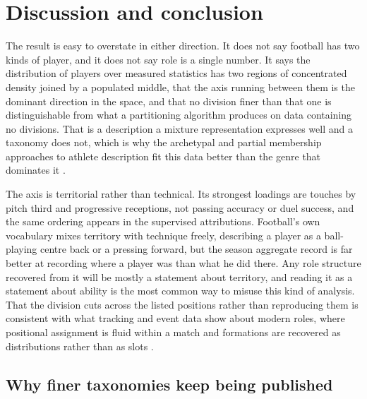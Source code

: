 \section{Discussion and conclusion}
\label{sec:discussion}

The result is easy to overstate in either direction. It does not say football has two kinds of
player, and it does not say role is a single number. It says the distribution of players over
\ArcFeatures{} measured statistics has two regions of concentrated density joined by a populated
middle, that the axis running between them is the dominant direction in the space, and that no
division finer than that one is distinguishable from what a partitioning algorithm produces on
data containing no divisions. That is a description a mixture representation expresses well and a
taxonomy does not, which is why the archetypal and partial membership approaches to athlete
description fit this data better than the genre that dominates it \citep{eugster2012performance,
seri2024partial}.

The axis is territorial rather than technical. Its strongest loadings are touches by pitch third
and progressive receptions, not passing accuracy or duel success, and the same ordering appears in
the supervised attributions. Football's own vocabulary mixes territory with technique freely,
describing a player as a ball-playing centre back or a pressing forward, but the season aggregate
record is far better at recording where a player was than what he did there. Any role structure
recovered from it will be mostly a statement about territory, and reading it as a statement about
ability is the most common way to misuse this kind of analysis. That the division cuts across the
listed positions rather than reproducing them is consistent with what tracking and event data show
about modern roles, where positional assignment is fluid within a match and formations are
recovered as distributions rather than as slots \citep{bialkowski2014large, decroos2019player}.

\subsection{Why finer taxonomies keep being published}

